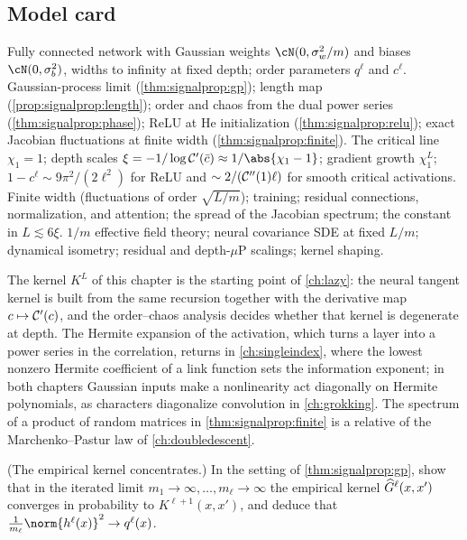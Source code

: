 \begin{refsection}
\section{Model card}\label{sec:signalprop:card}

{Fully connected network with Gaussian weights $\cN(0,\sigma_w^2/m)$ and biases $\cN(0,\sigma_b^2)$, widths to infinity at fixed depth; order parameters $q^\ell$ and $c^\ell$.}
{Gaussian-process limit (\cref{thm:signalprop:gp}); length map (\cref{prop:signalprop:length}); order and chaos from the dual power series (\cref{thm:signalprop:phase}); ReLU at He initialization (\cref{thm:signalprop:relu}); exact Jacobian fluctuations at finite width (\cref{thm:signalprop:finite}).}
{The critical line $\chi_1=1$; depth scales $\xi=-1/\log\signalpropC'(\bar c)\approx1/\abs{\chi_1-1}$; gradient growth $\chi_1^{L}$; $1-c^\ell\sim9\pi^2/(2\ell^2)$ for ReLU and $\sim2/(\mathcal{C}''(1)\ell)$ for smooth critical activations.}
{Finite width (fluctuations of order $\sqrt{L/m}$); training; residual connections, normalization, and attention; the spread of the Jacobian spectrum; the constant in $L\lesssim6\xi$.}
{$1/m$ effective field theory; neural covariance SDE at fixed $L/m$; dynamical isometry; residual and depth-$\mu$P scalings; kernel shaping.}

The kernel $K^L$ of this chapter is the starting point of \cref{ch:lazy}: the neural tangent kernel is built from the same recursion together with the derivative map $c\mapsto\mathcal{C}'(c)$, and the order--chaos analysis decides whether that kernel is degenerate at depth. The Hermite expansion of the activation, which turns a layer into a power series in the correlation, returns in \cref{ch:singleindex}, where the lowest nonzero Hermite coefficient of a link function sets the information exponent; in both chapters Gaussian inputs make a nonlinearity act diagonally on Hermite polynomials, as characters diagonalize convolution in \cref{ch:grokking}. The spectrum of a product of random matrices in \cref{thm:signalprop:finite} is a relative of the Marchenko--Pastur law of \cref{ch:doubledescent}.

\begin{exercises}
\item \consolidation (The empirical kernel concentrates.) In the setting of \cref{thm:signalprop:gp}, show that in the iterated limit $m_1\to\infty,\dots,m_\ell\to\infty$ the empirical kernel $\widehat{G}^\ell(x,x')$ converges in probability to $K^{\ell+1}(x,x')$, and deduce that $\frac1{m_\ell}\norm{h^\ell(x)}^2\to q^\ell(x)$. \label{ex:signalprop:empirical}


\end{exercises}
\end{refsection}
